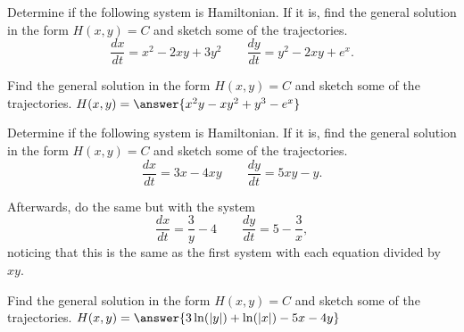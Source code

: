 \documentclass{ximera}
\begin{document}
\begin{exercise}
    Determine if the following system is Hamiltonian. If it is, find the general solution in the form $H(x,y) = C$ and sketch some of the trajectories.
    \[ 
        \frac{dx}{dt} = x^2 - 2xy + 3y^2 \qquad \frac{dy}{dt} = y^2 - 2xy + e^x .
    \]
    \begin{multipleChoice}
    \end{multipleChoice}
    \begin{problem}
        Find the general solution in the form $H(x,y) = C$ and sketch some of the trajectories. $H(x,y) = \answer{x^2y - xy^2 + y^3 - e^x}$
    \end{problem}
\end{exercise}


\begin{exercise}
    Determine if the following system is Hamiltonian. If it is, find the general solution in the form $H(x,y) = C$ and sketch some of the trajectories.
    \[ 
        \frac{dx}{dt} = 3x - 4xy \qquad \frac{dy}{dt} = 5xy - y.
    \]
    \begin{multipleChoice}
    \end{multipleChoice}
    \begin{problem}
        Afterwards, do the same but with the system 
        \[ 
            \frac{dx}{dt} = \frac{3}{y} - 4 \qquad \frac{dy}{dt} = 5 - \frac{3}{x}, 
        \] 
        noticing that this is the same as the first system with each equation divided by $xy$.
        \begin{multipleChoice}
        \end{multipleChoice}
        \begin{problem}
            Find the general solution in the form $H(x,y) = C$ and sketch some of the trajectories. $H(x,y) = \answer{3\ln(|y|)  + \ln(|x|) - 5x - 4y}$
        \end{problem}
    \end{problem}
\end{exercise}
\end{document}
